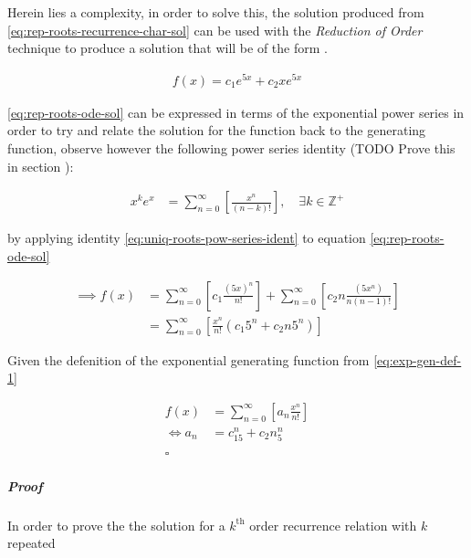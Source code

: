 \documentclass[11pt]{article}
\begin{document}
Herein lies a complexity, in order to solve this, the solution produced from \eqref{eq:rep-roots-recurrence-char-sol} can be used with the \emph{Reduction of Order} technique to produce a solution that will be of the form \cite[]{zillMatrixExponential2009}.

\begin{align}
    f{\left({ x }\right)}= c_1e^{5x} +  c_2 x e^{5x} \label{eq:rep-roots-ode-sol}
\end{align}

\eqref{eq:rep-roots-ode-sol} can be expressed in terms of the exponential power series in order to try and relate the solution for the function back to the generating function,
observe however the following power series identity (TODO Prove this in section ):

\begin{align}
    x^ke^x &= \sum^{\infty}_{n= 0}   {\left[{ \frac{x^n}{{\left({ n- k }\right)}!} }\right]}, \quad \exists k \in \mathbb{Z}^+ \label{eq:uniq-roots-pow-series-ident}
\end{align}

by applying identity \eqref{eq:uniq-roots-pow-series-ident} to equation \eqref{eq:rep-roots-ode-sol}

\begin{align}
    \implies  f{\left({ x }\right)} &= \sum^{\infty}_{n= 0}   {\left[{ c_1 \frac{{\left({ 5x }\right)}^n}{n!} }\right]}  +  \sum^{\infty}_{n= 0}   {\left[{ c_2 n \frac{{\left({ 5x^n }\right)}}{n{\left({ n-1 }\right)}!} }\right]} \nonumber \\
 &= \sum^{\infty}_{n= 0}   {\left[{ \frac{x^n}{n!} {\left({ c_{1}5^n +  c_2 n 5^n   }\right)} }\right]} \nonumber
\end{align}

Given the defenition of the exponential generating function from \eqref{eq:exp-gen-def-1}

\begin{align}
    f{\left({ x }\right)}&=     \sum^{\infty}_{n= 0}   {\left[{ a_n \frac{x^n}{n!} }\right]} \nonumber \\
    \iff a_n &= c_{15}^n +  c_2n_5^n \nonumber \\ \nonumber
    \ \nonumber \\
    \square \nonumber
\end{align}
\subparagraph{Proof}
\label{sec:org4fe7ea6}
In order to prove the the solution for a \(k^{\mathrm{th}}\) order recurrence relation with \(k\) repeated
\end{document}
